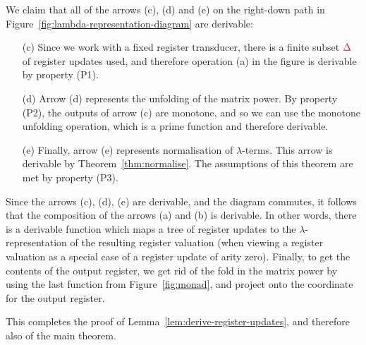 \pagebreak 
We claim that all of the arrows (c), (d) and (e) on the  right-down path  in  Figure~\ref{fig:lambda-representation-diagram}  are derivable:
\begin{itemize}
    \item[(c)] Since we work with a fixed register transducer, there is a finite subset ${\color{red}{\Delta}}$ of register updates  used, and therefore  operation (a) in the figure is derivable by property (P1).
    \item[(d)] Arrow (d) represents the unfolding of the matrix power. By property (P2), the outputs of arrow (c) are monotone, and so we can use the monotone unfolding operation, which is a  prime function and therefore derivable. 
    \item[(e)] Finally, arrow (e) represents normalisation of $\lambda$-terms. This arrow is derivable by Theorem~\ref{thm:normalise}. The assumptions of this theorem are met by property (P3).
\end{itemize}
Since the arrows (c), (d), (e) are derivable, and the diagram commutes, it follows that  the composition of the arrows (a) and (b) is derivable. In other words, there is a derivable function which maps a tree of register updates to the $\lambda$-representation of the resulting register valuation (when viewing a register valuation as a special case of a register update of arity zero). Finally, to get the contents of the output register, we get rid of the fold in the matrix power by using the last function from Figure~\ref{fig:monad}, and  project onto the coordinate for the output register. 



This completes the proof of Lemma~\ref{lem:derive-register-updates}, and therefore also of the main theorem. 




